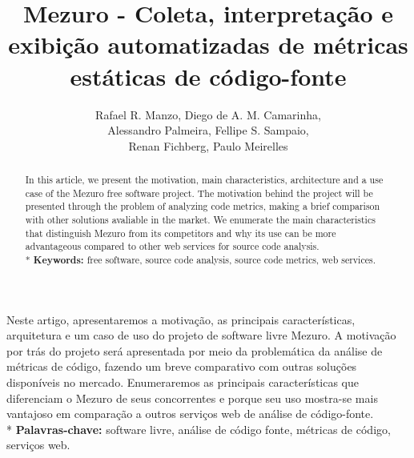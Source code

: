 \documentclass[10pt]{article}
\begin{document}
\sloppy
\singlespacing
\title{Mezuro - Coleta, interpretação e exibição automatizadas de métricas estáticas de código-fonte}

\author{Rafael R. Manzo, Diego de A. M. Camarinha,\\
        Alessandro Palmeira, Fellipe S. Sampaio,\\
        Renan Fichberg, Paulo Meirelles}

\address{Instituto de Matemática e Estatística -- Universidade de São Paulo (USP)\\
  Rua do Matão, 1010 -- 05508-090 -- Cidade Universitária -- São Paulo -- SP -- Brasil
\nextinstitute
  Faculdade de Engenharia -- UnB Gama (FGA)\\
  Gama -- DF -- Brasil
}

\maketitle
\begin{abstract}
  In this article, we present the motivation, main characteristics, architecture and a use case of the Mezuro free software project.
  The motivation behind the project will be presented through the problem of analyzing code metrics, making a brief comparison with
  other solutions avaliable in the market.
  We enumerate the main characteristics that distinguish Mezuro from its competitors and why its use can be more advantageous compared to other
  web services for source code analysis.
  \\*
  \textbf{Keywords:} free software, source code analysis, source code metrics, web services.
\end{abstract}

\begin{resumo}
  Neste artigo, apresentaremos a motivação, as principais características, arquitetura e um caso de uso do projeto de software livre Mezuro.
  A motivação por trás do projeto será apresentada por meio da problemática da análise de métricas de código, fazendo um breve
  comparativo com outras soluções disponíveis no mercado. Enumeraremos as principais características que diferenciam
  o Mezuro de seus concorrentes e porque seu uso mostra-se mais vantajoso em comparação a outros serviços web de análise de código-fonte.
  \\*
  \textbf{Palavras-chave:} software livre, análise de código fonte, métricas de código, serviços web.
\end{resumo}
\end{document}
